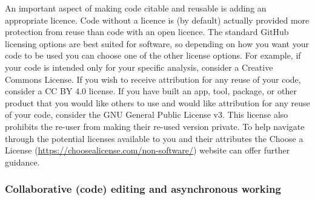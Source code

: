 An important aspect of making code citable and reusable is adding an appropriate licence.
Code without a licence is (by default) actually provided more protection from reuse than code with an open licence.
The standard GitHub licensing options are best suited for software, so depending on how you want your code to be used you can choose one of the other license options.
For example, if your code is intended only for your specific analysis, consider a Creative Commons License.
If you wish to receive attribution for any reuse of your code, consider a CC BY 4.0 license.
If you have built an app, tool, package, or other product that you would like others to use and would like attribution for any reuse of your code, consider the GNU General Public License v3.
This license also prohibits the re-user from making their re-used version private.
To help navigate through the potential licenses available to you and their attributes the Choose a License (\url{https://choosealicense.com/non-software/}) website can offer further guidance.

\hypertarget{collaborative-code-editing-and-asynchronous-working}{%
\subsubsection{Collaborative (code) editing and asynchronous working}\label{collaborative-code-editing-and-asynchronous-working}}

